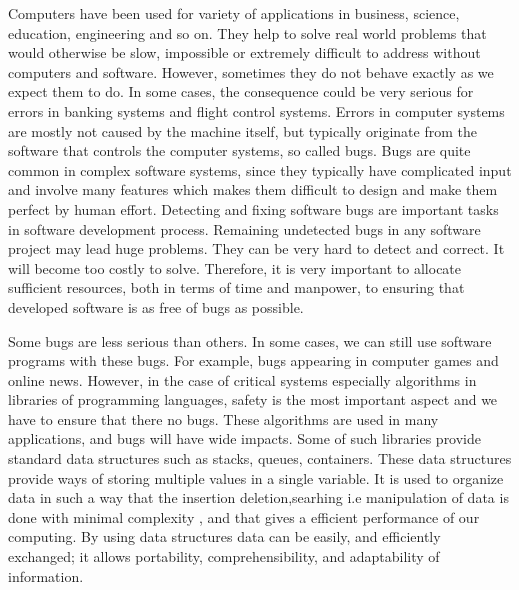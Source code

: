 \label{chapter:verification}

Computers have been used for variety of applications in business, science, education, engineering and so on. They help to solve real world problems that would otherwise be slow, impossible or extremely difficult to address without computers and software. However, sometimes they do not behave exactly as we expect them to do. In some cases, the consequence could be very serious for errors in banking systems
and flight control systems. Errors in computer systems are mostly not caused by the machine itself, but typically originate from the software that controls the computer systems, so called bugs. 
%
Bugs are quite common in complex software systems,
since they typically have complicated input and involve many features which makes them difficult to design and make them perfect by human effort.
%
Detecting and fixing software bugs are important tasks in software development process. Remaining undetected bugs in any software project may lead huge
problems. They can be very hard to detect and correct. It will
become too costly to solve. Therefore, it is very important to allocate sufficient
resources, both in terms of time and manpower, to ensuring that developed
software is as free of bugs as possible.

%
%
%

Some bugs are less serious than others. In some cases, we can still use software programs with these bugs. For example, bugs appearing in computer games and online news. However, in the case of critical systems 
especially algorithms in libraries of programming languages, safety is the most important aspect and we have to ensure that there no bugs. These algorithms are used in many applications, and bugs will have wide impacts. Some of such libraries provide standard data structures such as stacks, queues, containers. These data structures provide ways of storing multiple values in a single variable. It is used to organize data in such a way that the insertion deletion,searhing i.e manipulation of data is done with minimal complexity , and that gives a efficient performance of our computing. By using data structures data can be easily, and efficiently exchanged; it allows portability, comprehensibility, and adaptability of information.

